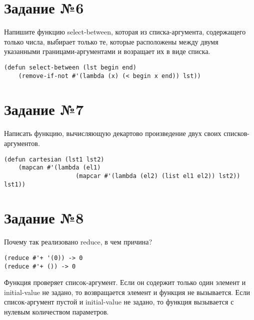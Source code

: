 \section{Задание №6}

Напишите функцию select-between, которая из списка-аргумента, содержащего
только числа, выбирает только те, которые расположены между двумя указанными
границами-аргументами и возращает их в виде списка.

\vspace{4mm}
\begin{minipage}{0.92\linewidth}
\begin{lstlisting}
(defun select-between (lst begin end)
    (remove-if-not #'(lambda (x) (< begin x end)) lst))
\end{lstlisting}
\end{minipage}

\section{Задание №7}

Написать функцию, вычисляющую декартово произведение двух своих
списков-аргументов.

\vspace{4mm}
\begin{minipage}{0.92\linewidth}
\begin{lstlisting}
(defun cartesian (lst1 lst2)
    (mapcan #'(lambda (el1)
                    (mapcar #'(lambda (el2) (list el1 el2)) lst2)) lst1))
\end{lstlisting}
\end{minipage}

\section{Задание №8}

Почему так реализовано reduce, в чем причина?

\vspace{4mm}
\begin{minipage}{0.92\linewidth}
\begin{lstlisting}
(reduce #'+ '(0)) -> 0
(reduce #'+ ()) -> 0
\end{lstlisting}
\end{minipage}

Функция проверяет список-аргумент. Если он содержит только один элемент и
initial-value не задано, то возвращается элемент и функция не вызывается.
Если список-аргумент пустой и initial-value не задано, то функция вызывается с
нулевым количеством параметров.

